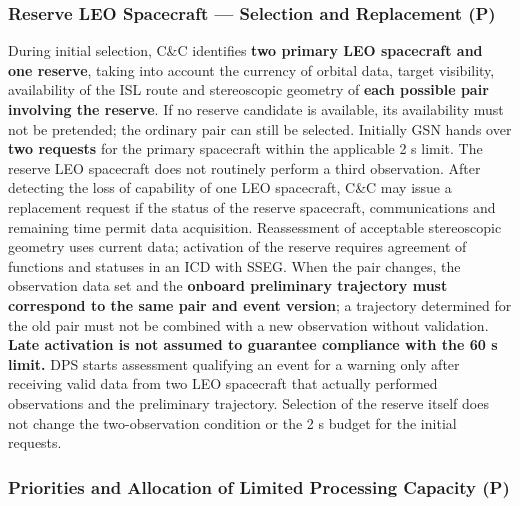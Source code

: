 \subsubsection{Reserve LEO Spacecraft — Selection and Replacement (P)}

During initial selection, C\&C identifies \textbf{two primary LEO spacecraft and one reserve}, taking into account the currency of orbital data, target visibility, availability of the ISL route and stereoscopic geometry of \textbf{each possible pair involving the reserve}. If no reserve candidate is available, its availability must not be pretended; the ordinary pair can still be selected. Initially GSN hands over \textbf{two requests} for the primary spacecraft within the applicable 2 s limit. The reserve LEO spacecraft does not routinely perform a third observation. After detecting the loss of capability of one LEO spacecraft, C\&C may issue a replacement request if the status of the reserve spacecraft, communications and remaining time permit data acquisition. Reassessment of acceptable stereoscopic geometry uses current data; activation of the reserve requires agreement of functions and statuses in an ICD with SSEG. When the pair changes, the observation data set and the \textbf{onboard preliminary trajectory must correspond to the same pair and event version}; a trajectory determined for the old pair must not be combined with a new observation without validation. \textbf{Late activation is not assumed to guarantee compliance with the 60 s limit.} DPS starts assessment qualifying an event for a warning only after receiving valid data from two LEO spacecraft that actually performed observations and the preliminary trajectory. Selection of the reserve itself does not change the two-observation condition or the 2 s budget for the initial requests.

\subsubsection{Priorities and Allocation of Limited Processing Capacity (P)}

